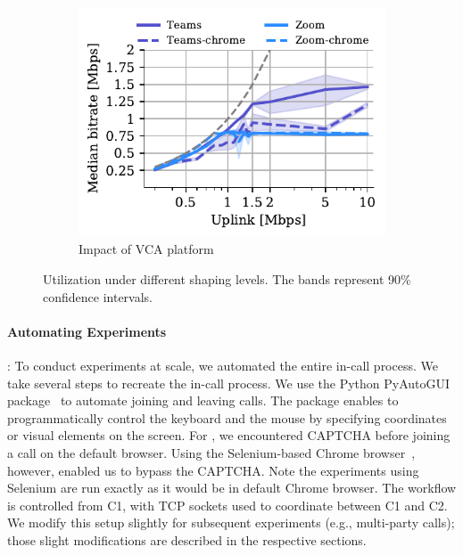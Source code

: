 \begin{figure}[t!]
\begin{subfigure}[t]{0.33\textwidth}
    \includegraphics[width=\textwidth,keepaspectratio]{figures/static/uplink_browser.pdf}
    \caption{Impact of VCA platform %
    }
	\label{subfig:uplink_browser}
\end{subfigure} 
\caption{Utilization under different shaping levels. The bands represent 90\% confidence intervals.}
\label{fig:static}
\end{figure}

\paragraph{Automating Experiments}: To conduct experiments at scale, we
automated the entire in-call process. We take several steps to recreate the
in-call process.  We use the Python PyAutoGUI package~\cite{pyautogui} to
automate joining and leaving calls. The package enables to programmatically
control the keyboard and the mouse by specifying coordinates or visual
elements on the screen. For \zoombrowser, we encountered CAPTCHA before
joining a call on the default browser. Using the Selenium-based Chrome
browser~\cite{selenium}, however, enabled us to bypass the CAPTCHA. Note the
experiments using Selenium are run exactly as it would be in default Chrome
browser. The workflow is controlled from C1, with TCP sockets used to
coordinate between C1 and C2.  We modify this setup slightly for subsequent
experiments (e.g., multi-party calls); those slight modifications are
described in the respective sections.


